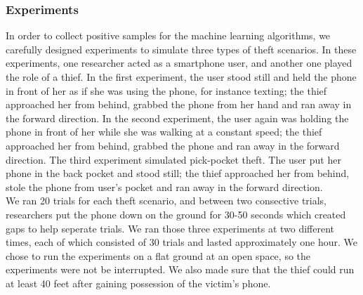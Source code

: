 \subsubsection{Experiments}
In order to collect positive samples for the machine learning algorithms, we carefully designed experiments to simulate three types of theft scenarios. In these experiments, one researcher acted as a smartphone user, and another one played the role of a thief. In the first experiment, the user stood still and held the phone in front of her as if she was using the phone, for instance texting; the thief approached her from behind, grabbed the phone from her hand and ran away in the forward direction. In the second experiment, the user again was holding the phone in front of her while she was walking at a constant speed; the thief approached her from behind, grabbed the phone and ran away in the forward direction. The third experiment simulated pick-pocket theft. The user put her phone in the back pocket and stood still; the thief approached her from behind, stole the phone from user's pocket and ran away in the forward direction. \\
We ran 20 trials for each theft scenario, and between two consective trials, researchers put the phone down on the ground for 30-50 seconds which created gaps to help seperate trials. We ran those three experiments at two different times, each of which consisted of 30 trials and lasted approximately one hour. We chose to run the experiments on a flat ground at an open space, so the experiments were not be interrupted. We also made sure that the thief could run at least 40 feet after gaining possession of the victim's phone.

